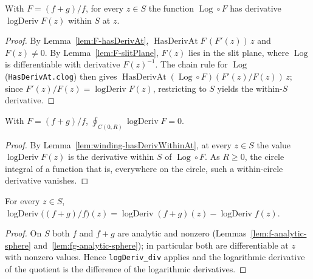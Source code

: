 \begin{lemma}
    \label{lem:winding-hasDerivWithinAt}
    \leanok
    With $F = (f+g)/f$, for every $z \in S$ the function
    $\operatorname{Log}\circ F$ has derivative $\operatorname{logDeriv} F(z)$
    within $S$ at $z$.
\end{lemma}
\begin{proof}
    By Lemma~\ref{lem:F-hasDerivAt}, $\operatorname{HasDerivAt} F\,(F'(z))\,z$ and
    $F(z) \neq 0$. By Lemma~\ref{lem:F-slitPlane}, $F(z)$ lies in the slit plane,
    where $\operatorname{Log}$ is differentiable with derivative $F(z)^{-1}$. The
    chain rule for $\operatorname{Log}$ (\texttt{HasDerivAt.clog}) then gives
    $\operatorname{HasDerivAt}(\operatorname{Log}\circ F)(F'(z)/F(z))\,z$; since
    $F'(z)/F(z) = \operatorname{logDeriv} F(z)$, restricting to $S$ yields the
    within-$S$ derivative.
\end{proof}

\begin{lemma}
    \label{lem:winding-cancel}
    \leanok
    With $F = (f+g)/f$, $\oint_{C(0,R)} \operatorname{logDeriv} F = 0$.
\end{lemma}
\begin{proof}
    By Lemma~\ref{lem:winding-hasDerivWithinAt}, at every $z \in S$ the value
    $\operatorname{logDeriv} F(z)$ is the derivative within $S$ of
    $\operatorname{Log}\circ F$. As $R \ge 0$, the circle integral of a function
    that is, everywhere on the circle, such a within-circle derivative vanishes.
\end{proof}

\begin{lemma}
    \label{lem:logDeriv-div-pointwise}
    \leanok
    For every $z \in S$,
    $\operatorname{logDeriv}\big((f+g)/f\big)(z)
       = \operatorname{logDeriv}(f+g)(z) - \operatorname{logDeriv} f(z)$.
\end{lemma}
\begin{proof}
    On $S$ both $f$ and $f+g$ are analytic and nonzero
    (Lemmas~\ref{lem:f-analytic-sphere} and~\ref{lem:fg-analytic-sphere}); in
    particular both are differentiable at $z$ with nonzero values. Hence
    \texttt{logDeriv\_div} applies and the logarithmic derivative of the quotient
    is the difference of the logarithmic derivatives.
\end{proof}

